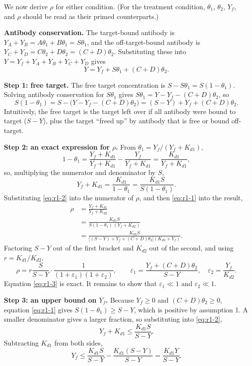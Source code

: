 \documentclass[11pt]{article}
\begin{document}
We now derive $\rho$ for either condition. (For the treatment condition,
$\theta_1$, $\theta_2$, $Y_f$, and $\rho$ should be read as their primed
counterparts.)

\textbf{Antibody conservation.} The target-bound antibody is
$Y_A+Y_B=A\theta_1+B\theta_1=S\theta_1$, and the off-target-bound antibody
is $Y_C+Y_D=C\theta_2+D\theta_2=(C+D)\theta_2$. Substituting these into
$Y=Y_f+Y_A+Y_B+Y_C+Y_D$ gives
$$
Y=Y_f+S\theta_1+(C+D)\theta_2.
$$

\textbf{Step 1: free target.} The free target concentration is
$S-S\theta_1=S(1-\theta_1)$. Solving antibody conservation for
$S\theta_1$ gives $S\theta_1=Y-Y_f-(C+D)\theta_2$, so
\begin{equation}
S(1-\theta_1)
=S-\bigl(Y-Y_f-(C+D)\theta_2\bigr)
=(S-Y)+Y_f+(C+D)\theta_2.
\label{eq:r1-1}
\end{equation}
Intuitively, the free target is the target left over if all antibody
were bound to target ($S-Y$), plus the target ``freed up'' by antibody
that is free or bound off-target.

\textbf{Step 2: an exact expression for $\rho$.} From
$\theta_1=Y_f/(Y_f+K_{d1})$,
$$
1-\theta_1
=\frac{Y_f+K_{d1}}{Y_f+K_{d1}}-\frac{Y_f}{Y_f+K_{d1}}
=\frac{K_{d1}}{Y_f+K_{d1}},
$$
so, multiplying the numerator and denominator by $S$,
\begin{equation}
Y_f+K_{d1}=\frac{K_{d1}}{1-\theta_1}=\frac{K_{d1}S}{S(1-\theta_1)}.
\label{eq:r1-2}
\end{equation}
Substituting \eqref{eq:r1-2} into the numerator of $\rho$, and then \eqref{eq:r1-1} into the
result,
$$\begin{aligned}
\rho
&=\frac{Y_f+K_{d1}}{Y_f+K_{d2}} \\
&=\frac{K_{d1}S}{S(1-\theta_1)\,(Y_f+K_{d2})} \\
&=\frac{K_{d1}S}{\bigl[(S-Y)+Y_f+(C+D)\theta_2\bigr](K_{d2}+Y_f)}.
\end{aligned}$$
Factoring $S-Y$ out of the first bracket and $K_{d2}$ out of the second,
and using $r=K_{d1}/K_{d2}$,
\begin{equation}
\rho
=r\frac{S}{S-Y}\cdot\frac{1}{(1+\varepsilon_1)(1+\varepsilon_2)},
\qquad
\varepsilon_1=\frac{Y_f+(C+D)\theta_2}{S-Y},
\quad
\varepsilon_2=\frac{Y_f}{K_{d2}}.
\label{eq:r1-3}
\end{equation}
Equation \eqref{eq:r1-3} is exact. It remains to show that $\varepsilon_1\ll1$ and
$\varepsilon_2\ll1$.

\textbf{Step 3: an upper bound on $Y_f$.} Because $Y_f\ge0$ and
$(C+D)\theta_2\ge0$, equation \eqref{eq:r1-1} gives $S(1-\theta_1)\ge S-Y$, which is
positive by assumption 1. A smaller denominator gives a larger fraction,
so substituting into \eqref{eq:r1-2},
$$
Y_f+K_{d1}\le\frac{K_{d1}S}{S-Y}.
$$
Subtracting $K_{d1}$ from both sides,
\begin{equation}
Y_f
\le\frac{K_{d1}S}{S-Y}-\frac{K_{d1}(S-Y)}{S-Y}
=\frac{K_{d1}Y}{S-Y}.
\label{eq:r1-4}
\end{equation}
\end{document}
